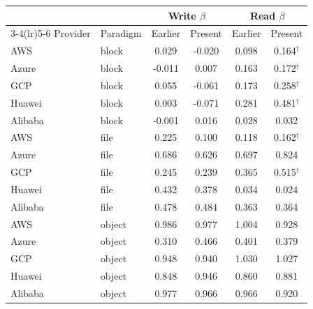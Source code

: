 \begin{tabular}{llcccc}
\toprule
 & & \multicolumn{2}{c}{Write $\beta$} & \multicolumn{2}{c}{Read $\beta$} \\
\cmidrule(lr){3-4}\cmidrule(lr){5-6}
Provider & Paradigm & Earlier & Present & Earlier & Present \\
\midrule
AWS & block & 0.029 & -0.020 & 0.098 & 0.164$^{\dagger}$ \\
Azure & block & -0.011 & 0.007 & 0.163 & 0.172$^{\dagger}$ \\
GCP & block & 0.055 & -0.061 & 0.173 & 0.258$^{\dagger}$ \\
Huawei & block & 0.003 & -0.071 & 0.281 & 0.481$^{\dagger}$ \\
Alibaba & block & -0.001 & 0.016 & 0.028 & 0.032 \\
\midrule
AWS & file & 0.225 & 0.100 & 0.118 & 0.162$^{\dagger}$ \\
Azure & file & 0.686 & 0.626 & 0.697 & 0.824 \\
GCP & file & 0.245 & 0.239 & 0.365 & 0.515$^{\dagger}$ \\
Huawei & file & 0.432 & 0.378 & 0.034 & 0.024 \\
Alibaba & file & 0.478 & 0.484 & 0.363 & 0.364 \\
\midrule
AWS & object & 0.986 & 0.977 & 1.004 & 0.928 \\
Azure & object & 0.310 & 0.466 & 0.401 & 0.379 \\
GCP & object & 0.948 & 0.940 & 1.030 & 1.027 \\
Huawei & object & 0.848 & 0.946 & 0.860 & 0.881 \\
Alibaba & object & 0.977 & 0.966 & 0.966 & 0.920 \\
\bottomrule
\end{tabular}
